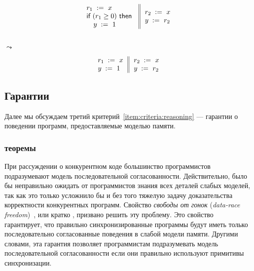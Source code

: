 {\footnotesize
\begin{minipage}{0.45\linewidth}
\begin{equation*}
\inarrII{
   \readInst{}{r_1}{x}             \\
   \kw{if} (r_1 \geq 0) ~\kw{then} \\
   \quad\writeInst{}{y}{1}         \\
}{
  \readInst{}{r_2}{x}               \\
  \writeInst{}{y}{r_2}              \\
}
\end{equation*}
\end{minipage}\hfill%
\begin{minipage}{0.05\linewidth}
\Large~\\ $\leadsto$
\end{minipage}\hfill%
\begin{minipage}{0.4\linewidth}
\begin{equation*}
\inarrII{
   \readInst{}{r_1}{x}             \\
   \writeInst{}{y}{1}              \\
}{
  \readInst{}{r_2}{x}               \\
  \writeInst{}{y}{r_2}              \\
}
\end{equation*}
\end{minipage}
}

\subsection{Гарантии}

Далее мы обсуждаем третий критерий~\ref{item:criteria:reasoning} ---
гарантии о поведении программ, предоставляемые моделью памяти.

\subsubsection{\DRF теоремы}
\label{sec:background:drf}

При рассуждении о конкурентном коде 
большинство программистов подразумевают 
модель последовательной согласованности. 
Действительно, было бы неправильно ожидать
от программистов знания всех деталей слабых моделей, 
так как это только усложнило бы и без того 
тяжелую задачу доказательства корректности 
конкурентных программ. 
Свойство \emph{свободы от гонок}
(\emph{data-race freedom})~\cite{Manson-al:POPL05}, 
или кратко \DRF, призвано решить эту проблему. 
Это свойство гарантирует, что правильно 
синхронизированные программы будут иметь 
только последовательно согласованные поведения 
в слабой модели памяти. 
Другими словами, эта гарантия позволяет программистам 
подразумевать модель последовательной согласованности
если они правильно используют примитивы синхронизации. 

